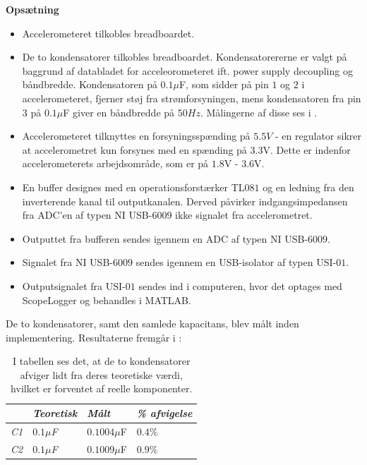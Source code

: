 \textbf{Opsætning}\label{Opsaetning}
\begin{itemize}
\item Accelerometeret tilkobles breadboardet.
\item De to kondensatorer tilkobles breadboardet. Kondensatorererne er valgt på baggrund af databladet for acceleorometeret ift. power supply decoupling og båndbredde. Kondensatoren på $0.1\mu$F, som sidder på pin $1$ og $2$ i accelerometeret, fjerner støj fra strømforsyningen, mens kondensatoren fra pin $3$ på $0.1\mu$F giver en båndbredde på $50Hz$. Målingerne af disse ses i .
\item Accelerometeret tilknyttes en forsyningsspænding på $5.5V$ - en regulator sikrer at accelerometret kun forsynes med en spænding på $3.3$V. Dette er indenfor accelerometerets arbejdsområde, som er på $1.8$V -  $3.6$V.
\item En buffer designes med en operationsforstærker TL$081$ og en ledning fra den inverterende kanal til outputkanalen. Derved påvirker indgangsimpedansen fra ADC'en af typen NI USB-$6009$ ikke signalet fra accelerometret.
\item Outputtet fra bufferen sendes igennem en ADC af typen NI USB-$6009$.
\item Signalet fra NI USB-$6009$ sendes igennem en USB-isolator af typen USI-$01$.
\item Outputsignalet fra USI-$01$ sendes ind i computeren, hvor det optages med ScopeLogger og behandles i MATLAB.
\end{itemize}

\noindent De to kondensatorer, samt den samlede kapacitans, blev målt inden implementering. Resultaterne fremgår i  :
\begin{table}[H]
	\centering
	\begin{tabular}{|l|l|l|l|}\hline
		& \textit{Teoretisk} & \textit{Målt} & \textit{\% afvigelse} \\ \hline
		\textit{C1}       & \textit{$0.1\mu$F} & $0.1004\mu$F  & $0.4\%$               \\ \hline		
		\textit{C2}       & \textit{$0.1\mu$F} & $0.1009\mu$F  & $0.9\%$               \\ \hline
	\end{tabular}
	\caption{I tabellen ses det, at de to kondensatorer afviger lidt fra deres teoretiske værdi, hvilket er forventet af reelle komponenter.}
	\label{Tab:Acc_kondensator_pilot}
\end{table}

